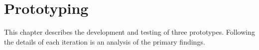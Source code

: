 \chapter{Prototyping}

This chapter describes the development and testing of three prototypes. Following the details of each iteration is an analysis of the primary findings.

